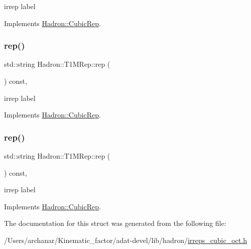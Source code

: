 irrep label 

Implements \mbox{\hyperlink{structHadron_1_1CubicRep_ac3eb63608803d44c68681f158e14eb1b}{Hadron\+::\+Cubic\+Rep}}.

\mbox{\label{structHadron_1_1T1MRep_a2a30092deab94944ea636fd8715be68d}} 
\subsubsection{\texorpdfstring{rep()}{rep()}\hspace{0.1cm}{\footnotesize\ttfamily [2/3]}}
{\footnotesize\ttfamily std\+::string Hadron\+::\+T1\+M\+Rep\+::rep (\begin{DoxyParamCaption}{ }\end{DoxyParamCaption}) const\hspace{0.3cm}{\ttfamily [inline]}, {\ttfamily [virtual]}}

irrep label 

Implements \mbox{\hyperlink{structHadron_1_1CubicRep_ac3eb63608803d44c68681f158e14eb1b}{Hadron\+::\+Cubic\+Rep}}.

\mbox{\label{structHadron_1_1T1MRep_a2a30092deab94944ea636fd8715be68d}} 
\subsubsection{\texorpdfstring{rep()}{rep()}\hspace{0.1cm}{\footnotesize\ttfamily [3/3]}}
{\footnotesize\ttfamily std\+::string Hadron\+::\+T1\+M\+Rep\+::rep (\begin{DoxyParamCaption}{ }\end{DoxyParamCaption}) const\hspace{0.3cm}{\ttfamily [inline]}, {\ttfamily [virtual]}}

irrep label 

Implements \mbox{\hyperlink{structHadron_1_1CubicRep_ac3eb63608803d44c68681f158e14eb1b}{Hadron\+::\+Cubic\+Rep}}.



The documentation for this struct was generated from the following file\+:\begin{DoxyCompactItemize}
\item 
/\+Users/archanar/\+Kinematic\+\_\+factor/adat-\/devel/lib/hadron/\mbox{\hyperlink{adat-devel_2lib_2hadron_2irreps__cubic__oct_8h}{irreps\+\_\+cubic\+\_\+oct.\+h}}\end{DoxyCompactItemize}
